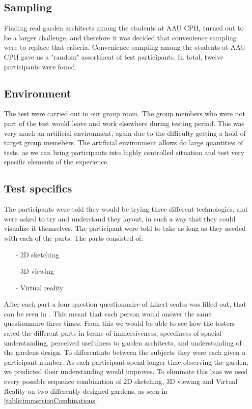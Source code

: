 \subsection{Sampling}
Finding real garden architects among the students at AAU CPH, turned out to be a larger challenge, and therefore it was decided that convenience sampling were to replace that criteria. Convenience sampling among the students at AAU CPH gave us a "random" assortment of test participants. In total, twelve participants were found.
\subsection{Environment}
The test were carried out in our group room. The group members who were not part of the test would leave and work elsewhere during testing period. This was very much an artificial environment, again due to the difficulty getting a hold of target group memebers. The artificial environment allows do large quantities of tests, as we can bring participants into highly controlled situation and test very specific elements of the experience.
\subsection{Test specifics}
The participants were told they would be trying three different technologies, and were asked to try and understand they layout, in such a way that they could visualize it themselves. The participant were told to take as long as they needed with each of the parts. The parts consisted of:
\begin{itemize}
	\item[-] 2D sketching
	\item[-] 3D viewing
	\item[-] Virtual reality
\end{itemize}
After each part a four question questionnaire of Likert scales was filled out, that can be seen in  . This meant that each person would answer the same questionnaire three times. From this we would be able to see how the testers rated the different parts in terms of immersiveness, speediness of spacial understanding, perceived usefulness to garden architects, and understanding of the gardens design. To differentiate between the subjects they were each given a participant number. As each participant spend longer time observing the garden, we predicted their understanding would improves. To eliminate this bias we used every possible sequence combination of 2D sketching, 3D viewing and Virtual Reality on two differently designed gardens, as seen in \autoref{table:immersionCombinations}.

